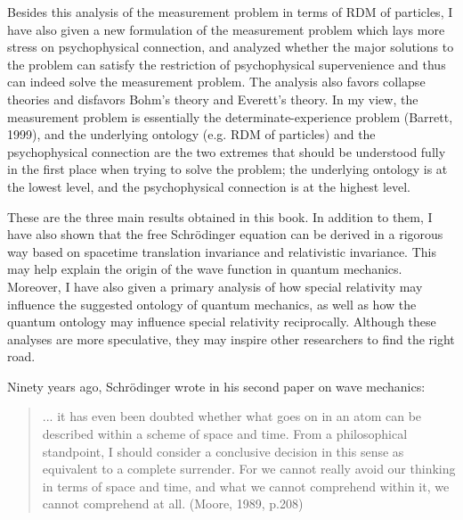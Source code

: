 Besides this analysis of the measurement problem in terms of RDM of particles, I have also given a new formulation of the measurement problem which lays more stress on psychophysical connection, and analyzed whether the major solutions to the problem can satisfy the restriction of psychophysical supervenience and thus can indeed solve the measurement problem. The analysis also favors collapse theories and disfavors Bohm's theory and Everett's theory. In my view, the measurement problem is essentially the determinate-experience problem (Barrett, 1999), and the underlying ontology (e.g. RDM of particles) and the psychophysical connection are the two extremes that should be understood fully in the first place when trying to solve the problem; the underlying ontology is at the lowest level, and the psychophysical connection is at the highest level.

These are the three main results obtained in this book. In addition to them, I have also shown that  the free Schr\"{o}dinger equation can be derived in a rigorous way based on spacetime translation invariance and relativistic invariance. This may help explain the origin of the wave function in quantum mechanics.
Moreover, I have also given a primary analysis of how special relativity may influence the suggested ontology of quantum mechanics, as well as how the quantum ontology may influence special relativity reciprocally. Although these analyses are more speculative, they may inspire other researchers to find the right road.

Ninety years ago, Schr\"{o}dinger wrote in his second paper on wave mechanics: 

\begin{quote}
... it has even been doubted whether what goes on in an atom can be described within a scheme of space and time. From a philosophical standpoint, I should consider a conclusive decision in this sense as equivalent to a complete surrender. For we cannot really avoid our thinking in terms of space and time, and what we cannot comprehend within it, we cannot comprehend at all. (Moore, 1989, p.208)
\end{quote}

